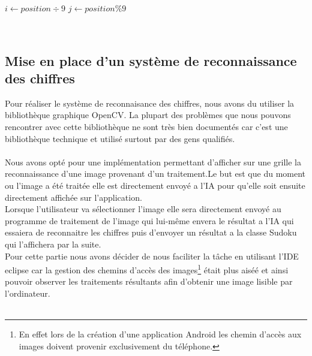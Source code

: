 \documentclass{article}
\begin{document}
\begin{algorithm}[H]
\SetAlgoLined
{}
$i \longleftarrow position \div 9  $
$j \longleftarrow position \% 9$\\
\end{algorithm}\\

\subsection{Mise en place d'un système de reconnaissance des chiffres}
Pour réaliser le système de reconnaisance des chiffres, nous avons du utiliser la bibliothèque graphique OpenCV.
La plupart des problèmes que nous pouvons rencontrer avec cette bibliothèque ne sont très bien documentés car c'est une bibliothèque technique et utilisé surtout par des gens qualifiés.\\\\
Nous avons opté pour une implémentation permettant d'afficher sur une grille la reconnaissance d'une image provenant d'un traitement.Le but est que du moment ou l'image a été traitée elle est directement envoyé a l'IA pour qu'elle soit ensuite directement affichée sur l'application.\\

Lorsque l'utilisateur va sélectionner l'image elle sera directement envoyé au programme de traitement de l'image qui lui-même envera le résultat a l'IA qui essaiera de reconnaitre les chiffres puis d'envoyer un résultat a la classe Sudoku qui l'affichera par la suite.\\

Pour cette partie nous avons décider de nous faciliter la tâche en utilisant l'IDE eclipse car la gestion des chemins d'accès des images\footnote{En effet lors de la création d'une application Android les chemin d'accès aux images doivent provenir exclusivement du téléphone.} était plus aiséé et ainsi pouvoir observer les traitements résultants afin d'obtenir une image lisible par l'ordinateur.\\
\\
\end{document}

